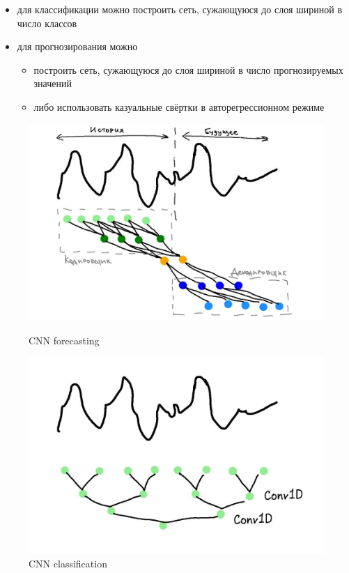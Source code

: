 \documentclass[12pt,fleqn]{article}
\begin{document}
\begin{itemize}
    \item для классификации можно построить сеть, сужающуюся до слоя шириной в число классов \cite{inception}
    \item для прогнозирования можно
    \begin{itemize}
        \item построить сеть, сужающуюся до слоя шириной в число прогнозируемых значений
        \item либо использовать казуальные свёртки в авторегрессионном режиме \cite{tcnpaper, wavenet, moderntcn}
    \end{itemize}
\end{itemize}

\begin{figure}[!htb]
    \centering
    \begin{minipage}{0.45\linewidth}
        \centering
        \includegraphics[width=\linewidth]{illustrations/cnn-forecasting.jpg}
        \caption{CNN forecasting}
        \label{fig:mlp-forecasting}
    \end{minipage}
    \begin{minipage}{0.45\linewidth}
        \centering
        \includegraphics[width=\linewidth]{illustrations/cnn-clf.jpg}
        \caption{CNN classification}
        \label{fig:mlp-classification}
    \end{minipage}
\end{figure}
\end{document}
